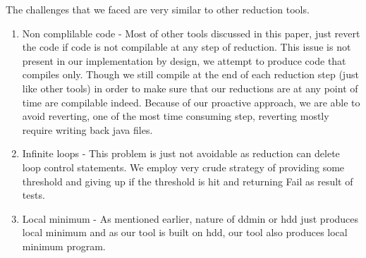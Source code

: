 The challenges that we faced are very similar to other reduction tools. 

\begin{enumerate}
\item Non complilable code - Most of other tools discussed in this paper, just revert the code if code is not compilable at any step of reduction. This issue is not present in our implementation by design, we attempt to produce code that compiles only. Though we still compile at the end of each reduction step (just like other tools) in order to make sure that our reductions are at any point of time are compilable indeed. Because of our proactive approach, we are able to avoid reverting, one of the most time consuming step, reverting mostly require writing back java files. 
\item Infinite loops - This problem is just not avoidable as reduction can delete loop control statements. We employ very crude strategy of providing some threshold and giving up if the threshold is hit and returning Fail as result of tests. 
\item Local minimum - As mentioned earlier, nature of ddmin or hdd just produces local minimum and as our tool is built on hdd, our tool also produces local minimum program.
\end{enumerate}